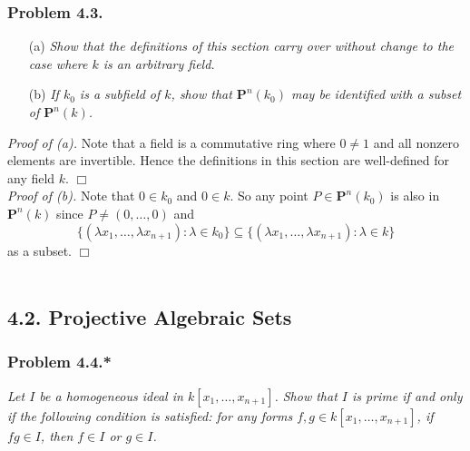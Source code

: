 \documentclass{article}
\begin{document}



\subsubsection*{Problem 4.3.}
\begin{enumerate}
\item[(a)]
  \emph{Show that the definitions of this section carry over without change to the
  case where $k$ is an arbitrary field.}

\item[(b)]
  \emph{If $k_0$ is a subfield of $k$, show that $\mathbf{P}^{n}(k_0)$
  may be identified with a subset of $\mathbf{P}^{n}(k)$.} \\
\end{enumerate}



\emph{Proof of (a).}
Note that a field is a commutative ring where $0 \neq 1$ and all nonzero elements are invertible.
Hence the definitions in this section are well-defined for any field $k$.
$\Box$ \\



\emph{Proof of (b).}
Note that $0 \in k_0$ and $0 \in k$.
So any point $P \in \mathbf{P}^{n}(k_0)$ is also in $\mathbf{P}^{n}(k)$
since $P \neq (0, \ldots, 0)$
and
\[
  \{ (\lambda x_1, \ldots, \lambda x_{n+1}) : \lambda \in k_0 \}
  \subseteq
  \{ (\lambda x_1, \ldots, \lambda x_{n+1}) : \lambda \in k \}
\]
as a subset.
$\Box$ \\\\






\subsection*{4.2. Projective Algebraic Sets \\}



\subsubsection*{Problem 4.4.*}
\emph{Let $I$ be a homogeneous ideal in $k[x_1,\ldots,x_{n+1}]$.
Show that $I$ is prime if and only if the following condition is satisfied:
for any forms $f, g \in k[x_1,\ldots,x_{n+1}]$,
if $fg \in I$, then $f \in I$ or $g \in I$.} \\
\end{document}
